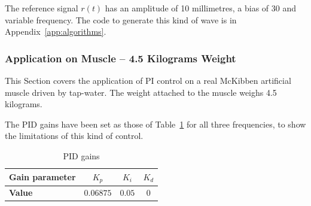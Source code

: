 The reference signal $r(t)$ has an amplitude of 10 millimetres, a bias of 30
and variable frequency. The code to generate this kind of wave
is in Appendix~\ref{app:algorithms}.

\subsubsection{Application on Muscle -- 4.5 Kilograms Weight}
\label{sec:6.4.5kg}

This Section covers the application of PI control on a real McKibben artificial muscle
driven by tap-water. The weight attached to the muscle weighs 4.5 kilograms.

The PID gains have been set as those of Table~\ref{tab:pid_gains_45}
for all three frequencies, to show the limitations of this kind of control.

\begin{table}[H]
	\centering
	\begin{tabular}{l c c c}
		\toprule
		\textbf{Gain parameter}	& $K_p$		& $K_i$		& $K_d$ \\ \midrule
		\textbf{Value}			& $0.06875$	& $0.05$	& $0$ \\ \bottomrule
	\end{tabular}
	\caption{PID gains}
	\label{tab:pid_gains_45}
\end{table}

